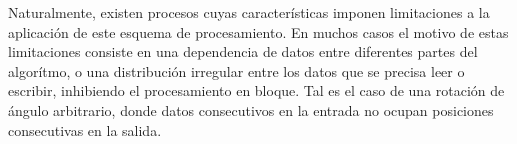 
Naturalmente, existen procesos cuyas características imponen limitaciones a la aplicación de este esquema de procesamiento. En muchos casos el motivo de estas limitaciones consiste en una dependencia de datos entre diferentes partes del algorítmo, o una distribución irregular entre los datos que se precisa leer o escribir, inhibiendo el procesamiento en bloque. Tal es el caso de una rotación de ángulo arbitrario, donde datos consecutivos en la entrada no ocupan posiciones consecutivas en la salida.